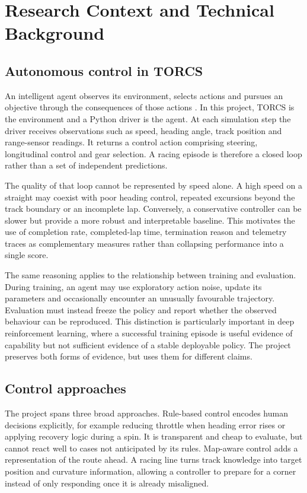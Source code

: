 \section{Research Context and Technical Background}
\label{ch:research-context}

\subsection{Autonomous control in TORCS}

An intelligent agent observes its environment, selects actions and pursues an objective through the consequences of those actions \parencite{russellnorvig2021}. In this project, TORCS is the environment and a Python driver is the agent. At each simulation step the driver receives observations such as speed, heading angle, track position and range-sensor readings. It returns a control action comprising steering, longitudinal control and gear selection. A racing episode is therefore a closed loop rather than a set of independent predictions.

The quality of that loop cannot be represented by speed alone. A high speed on a straight may coexist with poor heading control, repeated excursions beyond the track boundary or an incomplete lap. Conversely, a conservative controller can be slower but provide a more robust and interpretable baseline. This motivates the use of completion rate, completed-lap time, termination reason and telemetry traces as complementary measures rather than collapsing performance into a single score.

The same reasoning applies to the relationship between training and evaluation. During training, an agent may use exploratory action noise, update its parameters and occasionally encounter an unusually favourable trajectory. Evaluation must instead freeze the policy and report whether the observed behaviour can be reproduced. This distinction is particularly important in deep reinforcement learning, where a successful training episode is useful evidence of capability but not sufficient evidence of a stable deployable policy. The project preserves both forms of evidence, but uses them for different claims.

\subsection{Control approaches}

The project spans three broad approaches. Rule-based control encodes human decisions explicitly, for example reducing throttle when heading error rises or applying recovery logic during a spin. It is transparent and cheap to evaluate, but cannot react well to cases not anticipated by its rules. Map-aware control adds a representation of the route ahead. A racing line turns track knowledge into target position and curvature information, allowing a controller to prepare for a corner instead of only responding once it is already misaligned.

